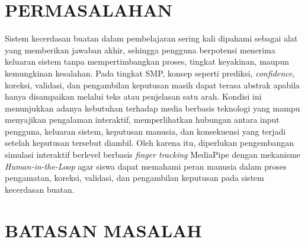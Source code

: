 \documentclass[12pt,a4paper,oneside,openany]{report}
\begin{document}
\section{PERMASALAHAN}
\label{sec:permasalahan}

Sistem kecerdasan buatan dalam pembelajaran sering kali dipahami sebagai alat yang memberikan jawaban akhir, sehingga pengguna berpotensi menerima keluaran sistem tanpa mempertimbangkan proses, tingkat keyakinan, maupun kemungkinan kesalahan. Pada tingkat SMP, konsep seperti prediksi, \textit{confidence}, koreksi, validasi, dan pengambilan keputusan masih dapat terasa abstrak apabila hanya disampaikan melalui teks atau penjelasan satu arah. Kondisi ini menunjukkan adanya kebutuhan terhadap media berbasis teknologi yang mampu menyajikan pengalaman interaktif, memperlihatkan hubungan antara input pengguna, keluaran sistem, keputusan manusia, dan konsekuensi yang terjadi setelah keputusan tersebut diambil. Oleh karena itu, diperlukan pengembangan simulasi interaktif berlevel berbasis \textit{finger tracking} MediaPipe dengan mekanisme \textit{Human-in-the-Loop} agar siswa dapat memahami peran manusia dalam proses pengamatan, koreksi, validasi, dan pengambilan keputusan pada sistem kecerdasan buatan.

\section{BATASAN MASALAH}
\label{sec:batasan-masalah}
\end{document}
